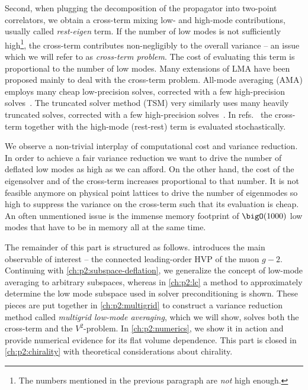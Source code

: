 Second, when plugging the decomposition of the propagator into two-point correlators, we obtain a cross-term mixing low- and high-mode contributions, usually called \emph{rest-eigen} term.
If the number of low modes is not sufficiently high\footnote{The numbers mentioned in the previous paragraph are \emph{not} high enough.}, the cross-term contributes non-negligibly to the overall variance -- an issue which we will refer to as \emph{cross-term problem}.
The cost of evaluating this term is proportional to the number of low modes.
Many extensions of LMA have been proposed mainly to deal with the cross-term problem.
All-mode averaging (AMA) employs many cheap low-precision solves, corrected with a few high-precision solves~\cite{Blum_2012,CAA,RBC_2018,Blum_2015}.
The truncated solver method (TSM) very similarly uses many heavily truncated solves, corrected with a few high-precision solves~\cite{bmw_2017,Kuberski:2023zky}.
In refs.~\cite{fermi_2023,lynch2023} the cross-term together with the high-mode (rest-rest) term is evaluated stochastically.

We observe a non-trivial interplay of computational cost and variance reduction.
In order to achieve a fair variance reduction we want to drive the number of deflated low modes as high as we can afford.
On the other hand, the cost of the eigensolver and of the cross-term increases proportional to that number.
It is not feasible anymore on physical point lattices to drive the number of eigenmodes so high to suppress the variance on the cross-term such that its evaluation is cheap.
An often unmentioned issue is the immense memory footprint of $\bigO(1000)$ low modes that have to be in memory all at the same time.

The remainder of this part is structured as follows.
 introduces the main observable of interest -- the connected leading-order HVP of the muon $g-2$.
Continuing with \cref{ch:p2:subspace-deflation}, we generalize the concept of low-mode averaging to arbitrary subspaces, whereas in \cref{ch:p2:lc} a method to approximately determine the low mode subspace used in solver preconditioning is shown.
These pieces are put together in \cref{ch:p2:multigrid} to construct a variance reduction method called \emph{multigrid low-mode averaging}, which we will show, solves both the cross-term and the $V^{2}$-problem.
In \cref{ch:p2:numerics}, we show it in action and provide numerical evidence for its flat volume dependence.
This part is closed in \cref{ch:p2:chirality} with theoretical considerations about chirality.


